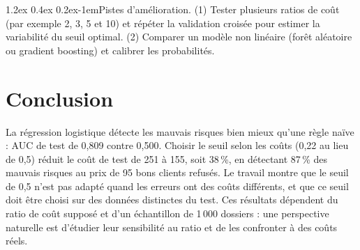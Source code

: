 \documentclass[11pt,a4paper]{article}
\makeatletter
\renewcommand\paragraph{\@startsection{paragraph}{4}{\z@}%
  {1.2ex \@plus 0.4ex \@minus 0.2ex}{-1em}{\normalfont\normalsize\bfseries}}
\makeatother
\begin{document}
\paragraph{Pistes d'amélioration.} (1) Tester plusieurs ratios de coût (par exemple 2, 3, 5 et 10) et répéter la validation croisée pour estimer la variabilité du seuil optimal. (2) Comparer un modèle non linéaire (forêt aléatoire ou gradient boosting) et calibrer les probabilités.

\section{Conclusion}
\label{sec:conclusion}
La régression logistique détecte les mauvais risques bien mieux qu'une règle naïve : AUC de test de 0,809 contre 0,500. Choisir le seuil selon les coûts (0,22 au lieu de 0,5) réduit le coût de test de 251 à 155, soit 38\,\%, en détectant 87\,\% des mauvais risques au prix de 95 bons clients refusés. Le travail montre que le seuil de 0,5 n'est pas adapté quand les erreurs ont des coûts différents, et que ce seuil doit être choisi sur des données distinctes du test. Ces résultats dépendent du ratio de coût supposé et d'un échantillon de 1\,000 dossiers : une perspective naturelle est d'étudier leur sensibilité au ratio et de les confronter à des coûts réels.
\end{document}
